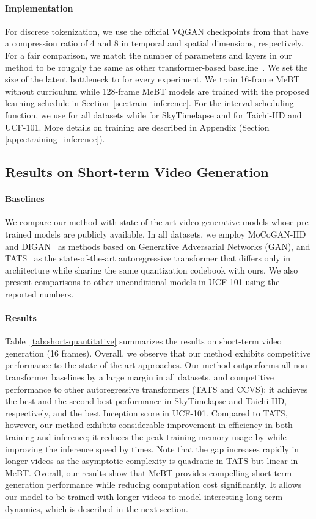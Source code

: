 \documentclass[10pt,twocolumn,letterpaper]{article}
\newcommand{\cutparagraphup}{\vspace*{-0.1in}}
\begin{document}
\paragraph{Implementation}
For discrete tokenization, we use the official VQGAN checkpoints from \cite{TATS} that have a compression ratio of 4 and 8 in temporal and spatial dimensions, respectively.
For a fair comparison, we match the number of parameters and layers in our method to be roughly the same as other transformer-based baseline~\cite{TATS}.
We set the size of the latent bottleneck to  for every experiment.
We train 16-frame MeBT without curriculum while 128-frame MeBT models are trained with the proposed learning schedule in Section~\ref{sec:train_inference}. 
For the interval scheduling function, we use  for all datasets while  for SkyTimelapse and  for Taichi-HD and UCF-101. 
More details on training are described in Appendix (Section \ref{appx:training_inference}).

\subsection{Results on Short-term Video Generation}
\paragraph{Baselines}
We compare our method with state-of-the-art video generative models whose pre-trained models are publicly available.
In all datasets, we employ MoCoGAN-HD~\cite{MoCoGAN-HD} and DIGAN~\cite{DIGAN} as methods based on Generative Adversarial Networks (GAN), and TATS~\cite{TATS} as the state-of-the-art autoregressive transformer that differs only in architecture while sharing the same quantization codebook with ours.
We also present comparisons to other unconditional models in UCF-101 using the reported numbers.


\cutparagraphup
\paragraph{Results}
Table~\ref{tab:short-quantitative} summarizes the results on short-term video generation (16 frames).
Overall, we observe that our method exhibits competitive performance to the state-of-the-art approaches.
Our method outperforms all non-transformer baselines by a large margin in all datasets, and competitive performance to other autoregressive transformers (TATS and CCVS); it achieves the best and the second-best performance in SkyTimelapse and Taichi-HD, respectively, and the best Inception score in UCF-101.
Compared to TATS, however, our method exhibits considerable improvement in efficiency in both training and inference; it reduces the peak training memory usage by  while improving the inference speed by  times.
Note that the gap increases rapidly in longer videos as the asymptotic complexity is quadratic in TATS but linear in MeBT.
Overall, our results show that MeBT provides compelling short-term generation performance while reducing computation cost significantly. 
It allows our model to be trained with longer videos to model interesting long-term dynamics, which is described in the next section.
\end{document}
